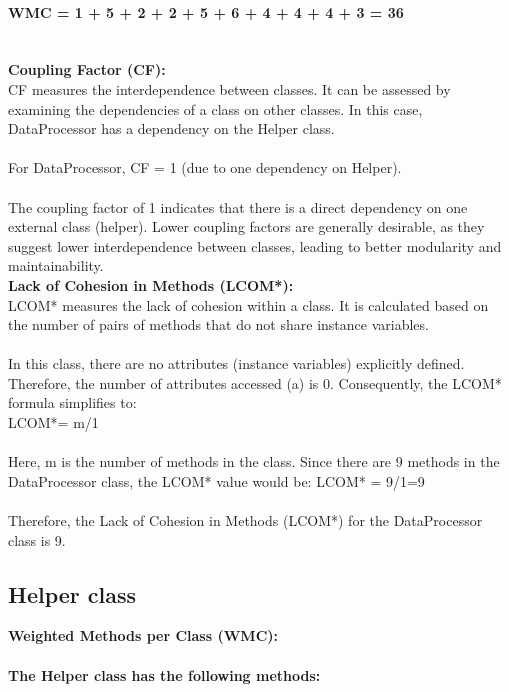 \documentclass[runningheads]{llncs}
\begin{document}
\paragraph{WMC = 1 + 5 + 2 + 2 + 5 + 6 + 4 + 4 + 4 + 3 = 36\\ \\}
\textbf{Coupling Factor (CF):}\\
CF measures the interdependence between classes. It can be assessed by examining the dependencies of a class on other classes. In this case, DataProcessor has a dependency on the Helper class.
\\ \\
For DataProcessor, CF = 1 (due to one dependency on Helper).
\\ \\
The coupling factor of 1 indicates that there is a direct dependency on one external class (helper). Lower coupling factors are generally desirable, as they suggest lower interdependence between classes, leading to better modularity and maintainability.\\

\textbf{Lack of Cohesion in Methods (LCOM*):}\\
LCOM* measures the lack of cohesion within a class. It is calculated based on the number of pairs of methods that do not share instance variables.
\\ \\
In this class, there are no attributes (instance variables) explicitly defined. Therefore, the number of attributes accessed (a) is 0. Consequently, the LCOM* formula simplifies to:
\\
LCOM*= m/1
\\ \\
Here, m is the number of methods in the class.
Since there are 9 methods in the DataProcessor class, the LCOM* value would be:
LCOM* = 9/1=9
\\ \\
Therefore, the Lack of Cohesion in Methods (LCOM*) for the DataProcessor class is 9.

\subsection{Helper class}

\textbf{Weighted Methods per Class (WMC):}
\paragraph{The Helper class has the following methods:}
\end{document}
